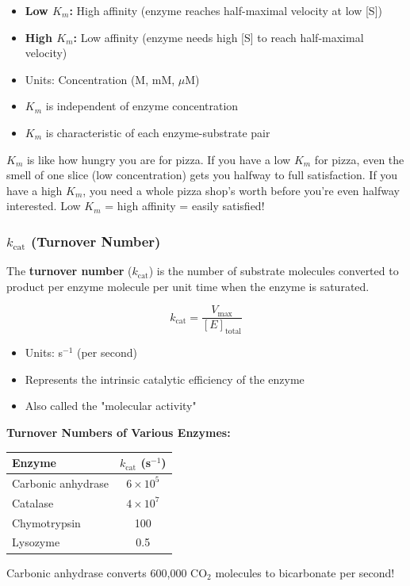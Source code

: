 \begin{itemize}
    \item \textbf{Low $K_m$:} High affinity (enzyme reaches half-maximal velocity at low [S])
    \item \textbf{High $K_m$:} Low affinity (enzyme needs high [S] to reach half-maximal velocity)
    \item Units: Concentration (M, mM, $\mu$M)
    \item $K_m$ is independent of enzyme concentration
    \item $K_m$ is characteristic of each enzyme-substrate pair
\end{itemize}

\begin{analogy}
$K_m$ is like how hungry you are for pizza. If you have a low $K_m$ for pizza, even the smell of one slice (low concentration) gets you halfway to full satisfaction. If you have a high $K_m$, you need a whole pizza shop's worth before you're even halfway interested. Low $K_m$ = high affinity = easily satisfied!
\end{analogy}

\subsubsection{$k_{\text{cat}}$ (Turnover Number)}

\begin{definition}
The \textbf{turnover number} ($k_{\text{cat}}$) is the number of substrate molecules converted to product per enzyme molecule per unit time when the enzyme is saturated.
\end{definition}

\[
k_{\text{cat}} = \frac{V_{\max}}{[E]_{\text{total}}}
\]

\begin{itemize}
    \item Units: s$^{-1}$ (per second)
    \item Represents the intrinsic catalytic efficiency of the enzyme
    \item Also called the "molecular activity"
\end{itemize}

\begin{example}
\textbf{Turnover Numbers of Various Enzymes:}
\begin{center}
\begin{tabular}{|l|c|}
\hline
\textbf{Enzyme} & \textbf{$k_{\text{cat}}$ (s$^{-1}$)} \\
\hline
Carbonic anhydrase & $6 \times 10^5$ \\
\hline
Catalase & $4 \times 10^7$ \\
\hline
Chymotrypsin & 100 \\
\hline
Lysozyme & 0.5 \\
\hline
\end{tabular}
\end{center}

Carbonic anhydrase converts 600,000 CO$_2$ molecules to bicarbonate per second!
\end{example}

